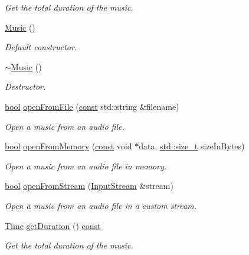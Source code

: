 \begin{DoxyCompactItemize}
\begin{DoxyCompactList}\small\item\em Get the total duration of the music. \end{DoxyCompactList}\item 
\hyperlink{classsf_1_1_music_a0bc787d8e022b3a9b89cf2c28befd42e}{Music} ()
\begin{DoxyCompactList}\small\item\em Default constructor. \end{DoxyCompactList}\item 
\hyperlink{classsf_1_1_music_a4c65860fed2f01d0eaa6c4199870414b}{$\sim$\-Music} ()
\begin{DoxyCompactList}\small\item\em Destructor. \end{DoxyCompactList}\item 
\hyperlink{term__entry_8h_a002004ba5d663f149f6c38064926abac}{bool} \hyperlink{classsf_1_1_music_a3edc66e5f5b3f11e84b90eaec9c7d7c0}{open\-From\-File} (\hyperlink{term__entry_8h_a57bd63ce7f9a353488880e3de6692d5a}{const} std\-::string \&filename)
\begin{DoxyCompactList}\small\item\em Open a music from an audio file. \end{DoxyCompactList}\item 
\hyperlink{term__entry_8h_a002004ba5d663f149f6c38064926abac}{bool} \hyperlink{classsf_1_1_music_ae93b21bcf28ff0b5fec458039111386e}{open\-From\-Memory} (\hyperlink{term__entry_8h_a57bd63ce7f9a353488880e3de6692d5a}{const} void $\ast$data, \hyperlink{nc__alloc_8h_a7b60c5629e55e8ec87a4547dd4abced4}{std\-::size\-\_\-t} size\-In\-Bytes)
\begin{DoxyCompactList}\small\item\em Open a music from an audio file in memory. \end{DoxyCompactList}\item 
\hyperlink{term__entry_8h_a002004ba5d663f149f6c38064926abac}{bool} \hyperlink{classsf_1_1_music_a4e55d1910a26858b44778c26b237d673}{open\-From\-Stream} (\hyperlink{classsf_1_1_input_stream}{Input\-Stream} \&stream)
\begin{DoxyCompactList}\small\item\em Open a music from an audio file in a custom stream. \end{DoxyCompactList}\item 
\hyperlink{classsf_1_1_time}{Time} \hyperlink{classsf_1_1_music_af4738b69c4c5038f71414ad7ffbbdc2b}{get\-Duration} () \hyperlink{term__entry_8h_a57bd63ce7f9a353488880e3de6692d5a}{const} 
\begin{DoxyCompactList}\small\item\em Get the total duration of the music. \end{DoxyCompactList}\end{DoxyCompactItemize}

